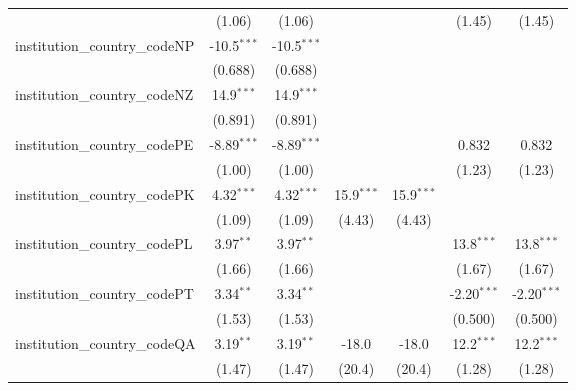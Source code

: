 \begin{tabular}{lcccccc}
                                         & (1.06)         & (1.06)         &               &               & (1.45)        & (1.45)\\   
   institution\_country\_codeNP          & -10.5$^{***}$  & -10.5$^{***}$  &               &               &               &   \\   
                                         & (0.688)        & (0.688)        &               &               &               &   \\   
   institution\_country\_codeNZ          & 14.9$^{***}$   & 14.9$^{***}$   &               &               &               &   \\   
                                         & (0.891)        & (0.891)        &               &               &               &   \\   
   institution\_country\_codePE          & -8.89$^{***}$  & -8.89$^{***}$  &               &               & 0.832         & 0.832\\   
                                         & (1.00)         & (1.00)         &               &               & (1.23)        & (1.23)\\   
   institution\_country\_codePK          & 4.32$^{***}$   & 4.32$^{***}$   & 15.9$^{***}$  & 15.9$^{***}$  &               &   \\   
                                         & (1.09)         & (1.09)         & (4.43)        & (4.43)        &               &   \\   
   institution\_country\_codePL          & 3.97$^{**}$    & 3.97$^{**}$    &               &               & 13.8$^{***}$  & 13.8$^{***}$\\   
                                         & (1.66)         & (1.66)         &               &               & (1.67)        & (1.67)\\   
   institution\_country\_codePT          & 3.34$^{**}$    & 3.34$^{**}$    &               &               & -2.20$^{***}$ & -2.20$^{***}$\\   
                                         & (1.53)         & (1.53)         &               &               & (0.500)       & (0.500)\\   
   institution\_country\_codeQA          & 3.19$^{**}$    & 3.19$^{**}$    & -18.0         & -18.0         & 12.2$^{***}$  & 12.2$^{***}$\\   
                                         & (1.47)         & (1.47)         & (20.4)        & (20.4)        & (1.28)        & (1.28)\\   

\end{tabular}
